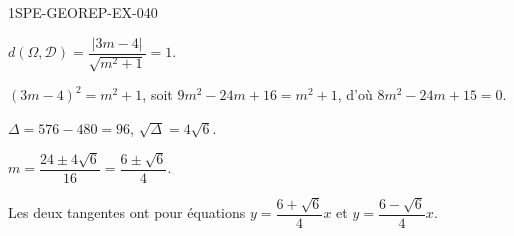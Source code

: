 \begin{corrige}{1SPE-GEOREP-EX-040}


$d(\Omega, \mathcal{D}) = \dfrac{|3m - 4|}{\sqrt{m^2 + 1}} = 1$.

$(3m-4)^2 = m^2 + 1$, soit $9m^2 - 24m + 16 = m^2 + 1$, d'où $8m^2 - 24m + 15 = 0$.

$\Delta = 576 - 480 = 96$, $\sqrt{\Delta} = 4\sqrt{6}$.

$m = \dfrac{24 \pm 4\sqrt{6}}{16} = \dfrac{6 \pm \sqrt{6}}{4}$.

Les deux tangentes ont pour équations $y = \dfrac{6 + \sqrt{6}}{4}x$ et $y = \dfrac{6 - \sqrt{6}}{4}x$.

\end{corrige}
